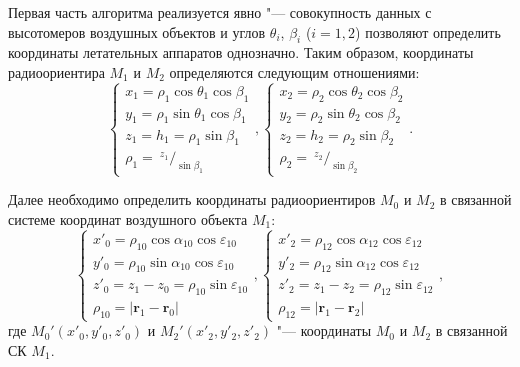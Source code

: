\documentclass[../main.tex]{subfiles}
\begin{document}
Первая часть алгоритма реализуется явно "--- совокупность данных с высотомеров воздушных объектов и углов $\theta_i$, $\beta_i$ ($i=1,2$) позволяют определить координаты летательных аппаратов однозначно. Таким образом, координаты радиоориентира $M_1$ и $M_2$ определяются следующим отношениями:
\begin{equation*}
    \begin{cases}
        x_1 = \rho_1 \cos\theta_1 \cos\beta_1 \\
        y_1 = \rho_1 \sin\theta_1 \cos\beta_1 \\
        z_1 = h_1 = \rho_1 \sin\beta_1 \\
        \rho_1 = ~^{z_1}/_{\sin\beta_1}
    \end{cases},
    \begin{cases}
        x_2 = \rho_2 \cos\theta_2 \cos\beta_2 \\
        y_2 = \rho_2 \sin\theta_2 \cos\beta_2 \\
        z_2 = h_2 = \rho_2 \sin\beta_2 \\
        \rho_2 = ~^{z_2}/_{\sin\beta_2}
    \end{cases}.
\end{equation*}

Далее необходимо определить координаты радиоориентиров $M_0$ и $M_2$ в связанной системе координат воздушного объекта $M_1$:
\begin{equation*}
    \begin{cases}
        x'_0 = \rho_{10} \cos\alpha_{10} \cos\varepsilon_{10} \\
        y'_0 = \rho_{10} \sin\alpha_{10} \cos\varepsilon_{10} \\
        z'_0 = z_1 - z_0 = \rho_{10} \sin\varepsilon_{10} \\
        \rho_{10} = |\mathbf{r}_1 - \mathbf{r}_0|
    \end{cases},
    \begin{cases}
        x'_2 = \rho_{12} \cos\alpha_{12} \cos\varepsilon_{12} \\
        y'_2 = \rho_{12} \sin\alpha_{12} \cos\varepsilon_{12} \\
        z'_2 = z_1 - z_2 = \rho_{12} \sin\varepsilon_{12} \\
        \rho_{12} = |\mathbf{r}_1 - \mathbf{r}_2|
    \end{cases},
\end{equation*}
где $M_0'\left(x'_0, y'_0, z'_0\right)$ и $M_2'\left(x'_2, y'_2, z'_2\right)$
"--- координаты $M_0$ и $M_2$ в связанной СК $M_1$.
\end{document}
